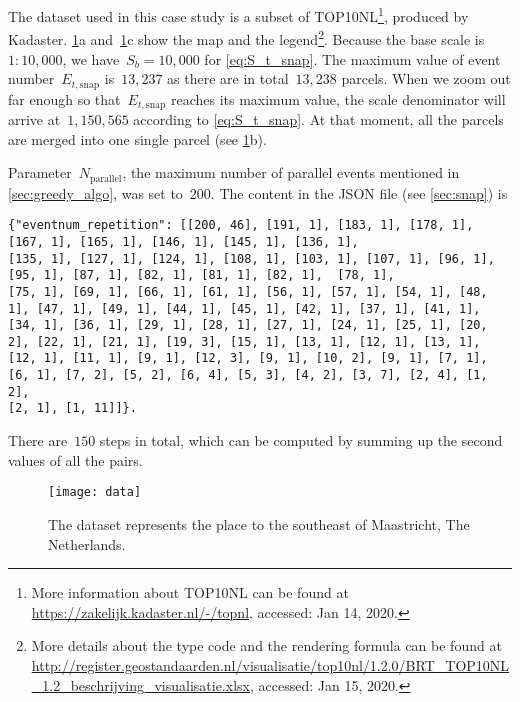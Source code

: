 \documentclass[ijgi,article,submit,moreauthors,pdftex]{Definitions/mdpi}
\begin{document}
The dataset used in this case study is a subset of TOP10NL\footnote{%
More information about TOP10NL can be found at
\url{https://zakelijk.kadaster.nl/-/topnl},
accessed: Jan 14, 2020.},
produced by Kadaster.
%
\figs\ref{fig:data}a and~\ref{fig:data}c show the map and the legend\footnote{%
More details about the type code and the rendering formula can be found at
\url{http://register.geostandaarden.nl/visualisatie/top10nl/1.2.0/BRT_TOP10NL_1.2_beschrijving_visualisatie.xlsx},
accessed: Jan 15, 2020.}.
%
Because the base scale is $1:10{,}000$, 
we have~$S_b = 10{,}000$ for \eq\ref{eq:S_t_snap}.
The maximum value of event number~$E_{t,\mathrm{snap}}$ is~$13{,}237$
as there are in total~$13{,}238$ parcels.
When we zoom out far enough 
so that~$E_{t,\mathrm{snap}}$ reaches its maximum value,
the scale denominator will arrive at~$1{,}150{,}565$
according to \eq\ref{eq:S_t_snap}.
At that moment, all the parcels are merged into one single parcel
(see \figs\ref{fig:data}b).


Parameter~$N_\mathrm{parallel}$, 
the maximum number of parallel events mentioned in \sect\ref{sec:greedy_algo},
was set to~$200$.
The content in the JSON file (see \sect\ref{sec:snap}) is 
\makeatletter
\def\verbatim@font{\normalfont\rmfamily}
\makeatother
\begin{verbatim}
{"eventnum_repetition": [[200, 46], [191, 1], [183, 1], [178, 1], [167, 1], [165, 1], [146, 1], [145, 1], [136, 1], 
[135, 1], [127, 1], [124, 1], [108, 1], [103, 1], [107, 1], [96, 1], [95, 1], [87, 1], [82, 1], [81, 1], [82, 1],  [78, 1], 
[75, 1], [69, 1], [66, 1], [61, 1], [56, 1], [57, 1], [54, 1], [48, 1], [47, 1], [49, 1], [44, 1], [45, 1], [42, 1], [37, 1], [41, 1], 
[34, 1], [36, 1], [29, 1], [28, 1], [27, 1], [24, 1], [25, 1], [20, 2], [22, 1], [21, 1], [19, 3], [15, 1], [13, 1], [12, 1], [13, 1], 
[12, 1], [11, 1], [9, 1], [12, 3], [9, 1], [10, 2], [9, 1], [7, 1], [6, 1], [7, 2], [5, 2], [6, 4], [5, 3], [4, 2], [3, 7], [2, 4], [1, 2], 
[2, 1], [1, 11]]}.
\end{verbatim}
There are~$150$ steps in total, 
which can be computed by summing up the second values of all the pairs.








\begin{figure}[tb]
\centering
\texttt{[image: data]}
\caption{The dataset represents the place 
    to the southeast of Maastricht, The Netherlands.}
\label{fig:data}
\end{figure}
\end{document}

